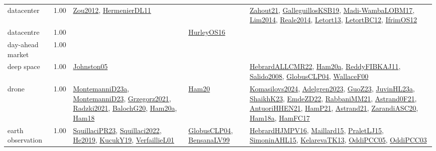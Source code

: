{\begin{longtable}{p{3cm}r>{\raggedright\arraybackslash}p{6cm}>{\raggedright\arraybackslash}p{6cm}>{\raggedright\arraybackslash}p{8cm}}
\index{datacenter}\index{ApplicationAreas!datacenter}datacenter &  1.00 & \hyperref[detail:Zou2012]{Zou2012}, \hyperref[detail:HermenierDL11]{HermenierDL11} &  & \hyperref[detail:Zahout21]{Zahout21}, \hyperref[detail:GalleguillosKSB19]{GalleguillosKSB19}, \hyperref[detail:Madi-WambaLOBM17]{Madi-WambaLOBM17}, \hyperref[detail:Lim2014]{Lim2014}, \hyperref[detail:Reale2014]{Reale2014}, \hyperref[detail:Letort13]{Letort13}, \hyperref[detail:LetortBC12]{LetortBC12}, \hyperref[detail:IfrimOS12]{IfrimOS12}\\
\index{datacentre}\index{ApplicationAreas!datacentre}datacentre &  1.00 &  & \hyperref[detail:HurleyOS16]{HurleyOS16} & \\
\index{day-ahead market}\index{ApplicationAreas!day-ahead market}day-ahead market &  1.00 &  &  & \\
\index{deep space}\index{ApplicationAreas!deep space}deep space &  1.00 & \hyperref[detail:Johnston05]{Johnston05} &  & \hyperref[detail:HebrardALLCMR22]{HebrardALLCMR22}, \hyperref[detail:Ham20a]{Ham20a}, \hyperref[detail:ReddyFIBKAJ11]{ReddyFIBKAJ11}, \hyperref[detail:Salido2008]{Salido2008}, \hyperref[detail:GlobusCLP04]{GlobusCLP04}, \hyperref[detail:WallaceF00]{WallaceF00}\\
\index{drone}\index{ApplicationAreas!drone}drone &  1.00 & \hyperref[detail:MontemanniD23a]{MontemanniD23a}, \hyperref[detail:MontemanniD23]{MontemanniD23}, \hyperref[detail:Grzegorz2021]{Grzegorz2021}, \hyperref[detail:Radzki2021]{Radzki2021}, \hyperref[detail:BalochG20]{BalochG20}, \hyperref[detail:Ham20a]{Ham20a}, \hyperref[detail:Ham18]{Ham18} & \hyperref[detail:Ham20]{Ham20} & \hyperref[detail:Komasilovs2024]{Komasilovs2024}, \hyperref[detail:Adelgren2023]{Adelgren2023}, \hyperref[detail:GuoZ23]{GuoZ23}, \hyperref[detail:JuvinHL23a]{JuvinHL23a}, \hyperref[detail:ShaikhK23]{ShaikhK23}, \hyperref[detail:EmdeZD22]{EmdeZD22}, \hyperref[detail:RabbaniMM21]{RabbaniMM21}, \hyperref[detail:Astrand0F21]{Astrand0F21}, \hyperref[detail:AntuoriHHEN21]{AntuoriHHEN21}, \hyperref[detail:HamP21]{HamP21}, \hyperref[detail:Astrand21]{Astrand21}, \hyperref[detail:ZarandiASC20]{ZarandiASC20}, \hyperref[detail:Ham18a]{Ham18a}, \hyperref[detail:HamFC17]{HamFC17}\\
\index{earth observation}\index{ApplicationAreas!earth observation}earth observation &  1.00 & \hyperref[detail:SquillaciPR23]{SquillaciPR23}, \hyperref[detail:Squillaci2022]{Squillaci2022}, \hyperref[detail:He2019]{He2019}, \hyperref[detail:KucukY19]{KucukY19}, \hyperref[detail:VerfaillieL01]{VerfaillieL01} & \hyperref[detail:GlobusCLP04]{GlobusCLP04}, \hyperref[detail:BensanaLV99]{BensanaLV99} & \hyperref[detail:HebrardHJMPV16]{HebrardHJMPV16}, \hyperref[detail:Maillard15]{Maillard15}, \hyperref[detail:PraletLJ15]{PraletLJ15}, \hyperref[detail:SimoninAHL15]{SimoninAHL15}, \hyperref[detail:KelarevaTK13]{KelarevaTK13}, \hyperref[detail:OddiPCC05]{OddiPCC05}, \hyperref[detail:OddiPCC03]{OddiPCC03}\\

\end{longtable}}
